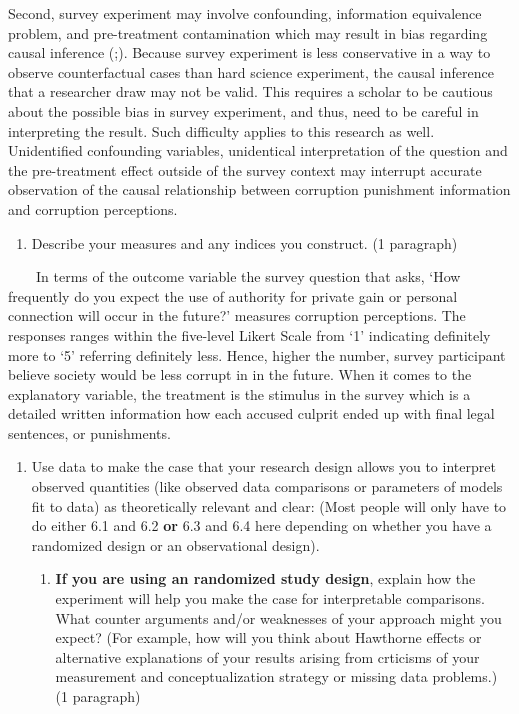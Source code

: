 \documentclass[
  11pt,
]{article}
\providecommand{\tightlist}{%
  \setlength{\itemsep}{0pt}\setlength{\parskip}{0pt}}
\begin{document}
Second, survey experiment may involve confounding, information
equivalence problem, and pre-treatment contamination which may result in
bias regarding causal inference
(\textcite{diaz_survey_2020};\textcite{dafoe_information_2018}). Because
survey experiment is less conservative in a way to observe
counterfactual cases than hard science experiment, the causal inference
that a researcher draw may not be valid. This requires a scholar to be
cautious about the possible bias in survey experiment, and thus, need to
be careful in interpreting the result. Such difficulty applies to this
research as well. Unidentified confounding variables, unidentical
interpretation of the question and the pre-treatment effect outside of
the survey context may interrupt accurate observation of the causal
relationship between corruption punishment information and corruption
perceptions.

\begin{enumerate}
\def\labelenumi{\arabic{enumi}.}
\setcounter{enumi}{4}
\tightlist
\item
  Describe your measures and any indices you construct. (1 paragraph)
\end{enumerate}

~~~~In terms of the outcome variable the survey question that asks, `How
frequently do you expect the use of authority for private gain or
personal connection will occur in the future?' measures corruption
perceptions. The responses ranges within the five-level Likert Scale
from `1' indicating definitely more to `5' referring definitely less.
Hence, higher the number, survey participant believe society would be
less corrupt in in the future. When it comes to the explanatory
variable, the treatment is the stimulus in the survey which is a
detailed written information how each accused culprit ended up with
final legal sentences, or punishments.

\begin{enumerate}
\def\labelenumi{\arabic{enumi}.}
\setcounter{enumi}{5}
\item
  Use data to make the case that your research design allows you to
  interpret observed quantities (like observed data comparisons or
  parameters of models fit to data) as theoretically relevant and clear:
  (Most people will only have to do either 6.1 and 6.2 \textbf{or} 6.3
  and 6.4 here depending on whether you have a randomized design or an
  observational design).

  \begin{enumerate}
  \def\labelenumii{\roman{enumii}.}
  \tightlist
  \item
    \textbf{If you are using an randomized study design}, explain how
    the experiment will help you make the case for interpretable
    comparisons. What counter arguments and/or weaknesses of your
    approach might you expect? (For example, how will you think about
    Hawthorne effects or alternative explanations of your results
    arising from crticisms of your measurement and conceptualization
    strategy or missing data problems.) (1 paragraph)
  \end{enumerate}
\end{enumerate}
\end{document}
